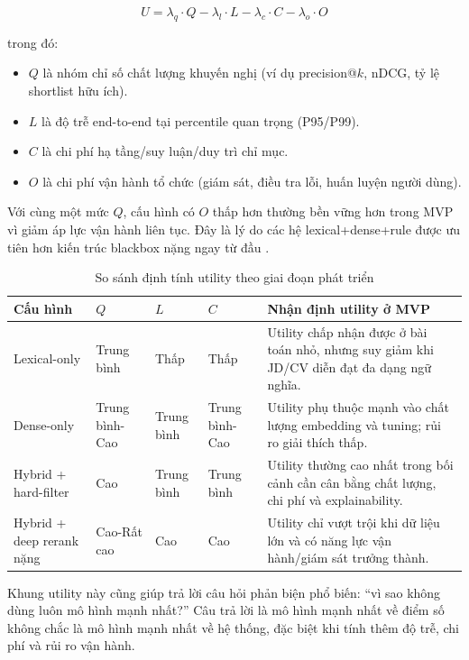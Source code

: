 \begin{equation}
U = \lambda_q \cdot Q - \lambda_l \cdot L - \lambda_c \cdot C - \lambda_o \cdot O
\end{equation}

trong đó:
\begin{itemize}
  \item $Q$ là nhóm chỉ số chất lượng khuyến nghị (ví dụ precision@$k$, nDCG, tỷ lệ shortlist hữu ích).
  \item $L$ là độ trễ end-to-end tại percentile quan trọng (P95/P99).
  \item $C$ là chi phí hạ tầng/suy luận/duy trì chỉ mục.
  \item $O$ là chi phí vận hành tổ chức (giám sát, điều tra lỗi, huấn luyện người dùng).
\end{itemize}

Với cùng một mức $Q$, cấu hình có $O$ thấp hơn thường bền vững hơn trong MVP vì giảm áp lực vận hành liên tục. Đây là lý do các hệ lexical+dense+rule được ưu tiên hơn kiến trúc blackbox nặng ngay từ đầu \cite{dpr,splade,colbertv2,hyrr}.

\begin{table}[H]
\caption{So sánh định tính utility theo giai đoạn phát triển}
\centering
\begin{tabularx}{\textwidth}{p{}p{}p{}p{}X}
\toprule
\textbf{Cấu hình} & \textbf{$Q$} & \textbf{$L$} & \textbf{$C$} & \textbf{Nhận định utility ở MVP}\\
\midrule
Lexical-only & Trung bình & Thấp & Thấp & Utility chấp nhận được ở bài toán nhỏ, nhưng suy giảm khi JD/CV diễn đạt đa dạng ngữ nghĩa.\\
Dense-only & Trung bình-Cao & Trung bình & Trung bình-Cao & Utility phụ thuộc mạnh vào chất lượng embedding và tuning; rủi ro giải thích thấp.\\
Hybrid + hard-filter & Cao & Trung bình & Trung bình & Utility thường cao nhất trong bối cảnh cần cân bằng chất lượng, chi phí và explainability.\\
Hybrid + deep rerank nặng & Cao-Rất cao & Cao & Cao & Utility chỉ vượt trội khi dữ liệu lớn và có năng lực vận hành/giám sát trưởng thành.\\
\bottomrule
\end{tabularx}
\end{table}

Khung utility này cũng giúp trả lời câu hỏi phản biện phổ biến: ``vì sao không dùng luôn mô hình mạnh nhất?'' Câu trả lời là mô hình mạnh nhất về điểm số không chắc là mô hình mạnh nhất về hệ thống, đặc biệt khi tính thêm độ trễ, chi phí và rủi ro vận hành.

